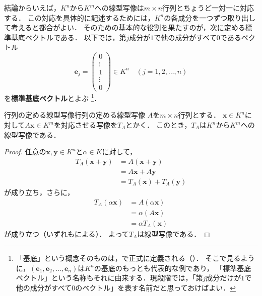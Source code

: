 結論からいえば，$K^n$から$K^m$への線型写像は$m \times n$行列とちょうど一対一に対応する．
この対応を具体的に記述するためには，$K^n$の各成分を一つずつ取り出して考えると都合がよい．
そのための基本的な役割を果たすのが，次に定める標準基底ベクトルである．
以下では，第$j$成分が$1$で他の成分がすべて$0$であるベクトル
\[
  \bm{e}_j =
  \begin{pmatrix}
    0 \\ \vdots \\ 1 \\ \vdots \\ 0
  \end{pmatrix}
  \in K^n
  \quad (j = 1, 2, \dots, n)
\]
を\textbf{標準基底ベクトル}とよぶ
\footnote{「基底」という概念そのものは，で正式に定義される（）．
そこで見るように，$(\bm{e}_1, \bm{e}_2, \dots, \bm{e}_n)$は$K^n$の基底のもっとも代表的な例であり，
「標準基底ベクトル」という名称もそれに由来する．現段階では，「第$j$成分だけが$1$で他の成分がすべて$0$のベクトル」を表す名前だと思っておけばよい．}．

\begin{prop}{行列の定める線型写像}{行列の定める線型写像}
  $A$を$m \times n$行列とする．
  $\bm{x} \in K^n$に対して$A\bm{x} \in K^m$を対応させる写像を$T_A$とかく．
  このとき，$T_A$は$K^n$から$K^m$への線型写像である．
\end{prop}

\begin{tleftbar}
\begin{proof}
  任意の$\bm{x}, \bm{y} \in K^n$と$\alpha \in K$に対して，
  \begin{align}
    T_A(\bm{x} + \bm{y}) &= A(\bm{x} + \bm{y}) \tag{$T_A$の定義} \\
    &= A\bm{x} + A\bm{y} \tag{行列の積の分配律} \\
    &= T_A(\bm{x}) + T_A(\bm{y}) \nonumber
  \end{align}
  が成り立ち，さらに，
  \begin{align}
    T_A(\alpha\bm{x}) &= A(\alpha\bm{x}) \tag{$T_A$の定義} \\
    &= \alpha(A\bm{x}) \tag{スカラー倍との両立} \\
    &= \alpha T_A(\bm{x}) \nonumber
  \end{align}
  が成り立つ（いずれもによる）．
  よって$T_A$は線型写像である．
\end{proof}
\end{tleftbar}


